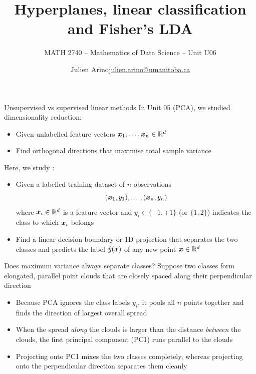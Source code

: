 \documentclass[aspectratio=169]{beamer}\usepackage[]{graphicx}\usepackage[]{xcolor}
\subtitle{MATH 2740 -- Mathematics of Data Science -- Unit U06}
\author{\texorpdfstring{Julien Arino\newline\url{julien.arino@umanitoba.ca}}{Julien Arino}}
\institute{Department of Mathematics @ University of Manitoba}
\title{Hyperplanes, linear classification and Fisher's LDA}
\begin{document}
\setcounter{theorem}{87}

\SStitlepage
\SSoutlinepage



\begin{frame}{Unsupervised vs supervised linear methods}
    In Unit 05 (PCA), we studied  dimensionality reduction:
    \begin{itemize}
        \item Given unlabelled feature vectors $\bm{x}_1, \ldots, \bm{x}_n \in \mathbb{R}^d$
        \item Find orthogonal directions that maximise total sample variance
    \end{itemize}
    \vfill
    Here, we study :
    \begin{itemize}
        \item Given a labelled training dataset of $n$ observations
        \[
            (\bm{x}_1, y_1), \ldots, (\bm{x}_n, y_n)
        \]
        where $\bm{x}_i \in \mathbb{R}^d$ is a feature vector and $y_i \in \{-1, +1\}$ (or $\{1, 2\}$) indicates the class to which $\bm{x}_i$ belongs
        \item Find a linear decision boundary or 1D projection that separates the two classes and predicts the label $\hat{y}(\bm{x})$ of any new point $\bm{x} \in \mathbb{R}^d$
    \end{itemize}
\end{frame}


\begin{frame}{Does maximum variance always separate classes?}
    Suppose two classes form elongated, parallel point clouds that are closely spaced along their perpendicular direction
    \vfill
    \begin{itemize}
        \item Because PCA ignores the class labels $y_i$, it pools all $n$ points together and finds the direction of largest overall spread
        \vfill
        \item When the spread \emph{along} the clouds is larger than the distance \emph{between} the clouds, the first principal component (PC1) runs parallel to the clouds
        \vfill
        \item Projecting onto PC1 mixes the two classes completely, whereas projecting onto the perpendicular direction separates them cleanly
    \end{itemize}
\end{frame}
\end{document}
